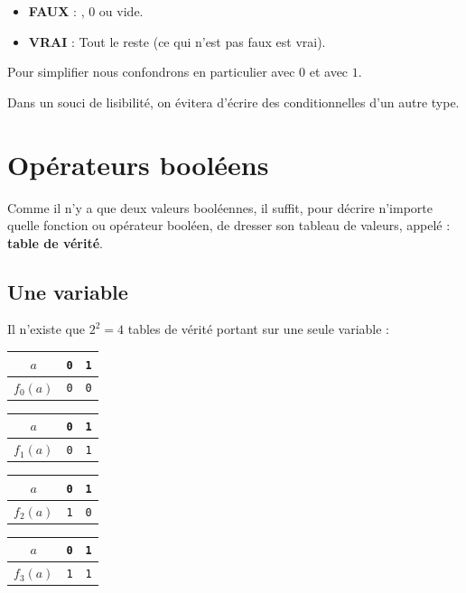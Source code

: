 \begin{itemize}
	\item {\bfseries FAUX} : , $0$ ou vide.
	\item {\bfseries VRAI} : Tout le reste (ce qui n'est pas faux est vrai).
\end{itemize}

Pour simplifier nous confondrons en particulier  avec $0$ et  avec $1$.

Dans un souci de lisibilité, on évitera d'écrire des conditionnelles d'un autre type.

\section{Opérateurs booléens}

Comme il n'y a que deux valeurs booléennes, il suffit, pour décrire n'importe quelle fonction ou opérateur booléen, de dresser son tableau de valeurs, appelé : {\bfseries table de vérité}.

\subsection{Une variable}

Il n'existe que $2^2=4$ tables de vérité portant sur une seule variable :

\begin{multicols}{4}

\begin{tabular}{c|cc}
$a$ & \texttt{0} & \texttt{1} \\
\hline
$f_0(a)$ & \texttt{0} & \texttt{0} \\
\end{tabular}


\begin{tabular}{c|cc}
$a$ & \texttt{0} & \texttt{1} \\
\hline
$f_1(a)$ & \texttt{0} & \texttt{1} \\
\end{tabular}


\begin{tabular}{c|cc}
$a$ & \texttt{0} & \texttt{1} \\
\hline
$f_2(a)$ & \texttt{1} & \texttt{0} \\
\end{tabular}


\begin{tabular}{c|cc}
$a$ & \texttt{0} & \texttt{1} \\
\hline
$f_3(a)$ & \texttt{1} & \texttt{1} \\
\end{tabular}

\end{multicols}

